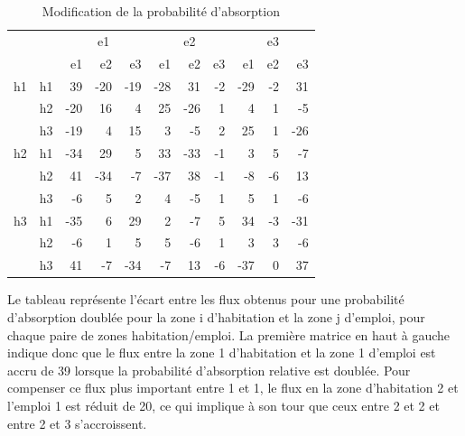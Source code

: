 \documentclass[
  10pt,
  a4paper,
  numbers=noendperiod,
  DIV=9]{scrreprt}
\begin{document}
\hypertarget{tbl-fluxpond}{}
\setlength{\LTpost}{0mm}
\begin{longtable}{l|lrrrrrrrrr}
\caption{\label{tbl-fluxpond}Modification de la probabilité d'absorption }\tabularnewline

\toprule
\multicolumn{1}{l}{} &  & \multicolumn{3}{c}{e1} & \multicolumn{3}{c}{e2} & \multicolumn{3}{c}{e3} \\ 
\cmidrule(lr){3-5} \cmidrule(lr){6-8} \cmidrule(lr){9-11}
\multicolumn{1}{l}{} &  & e1 & e2 & e3 & e1 & e2 & e3 & e1 & e2 & e3 \\ 
\midrule
h1 & h1 & 39 & -20 & -19 & -28 & 31 & -2 & -29 & -2 & 31 \\ 
 & h2 & -20 & 16 & 4 & 25 & -26 & 1 & 4 & 1 & -5 \\ 
 & h3 & -19 & 4 & 15 & 3 & -5 & 2 & 25 & 1 & -26 \\ 
\midrule
h2 & h1 & -34 & 29 & 5 & 33 & -33 & -1 & 3 & 5 & -7 \\ 
 & h2 & 41 & -34 & -7 & -37 & 38 & -1 & -8 & -6 & 13 \\ 
 & h3 & -6 & 5 & 2 & 4 & -5 & 1 & 5 & 1 & -6 \\ 
\midrule
h3 & h1 & -35 & 6 & 29 & 2 & -7 & 5 & 34 & -3 & -31 \\ 
 & h2 & -6 & 1 & 5 & 5 & -6 & 1 & 3 & 3 & -6 \\ 
 & h3 & 41 & -7 & -34 & -7 & 13 & -6 & -37 & 0 & 37 \\ 
\bottomrule
\end{longtable}
\begin{minipage}{\linewidth}
Le tableau représente l'écart entre les flux obtenus pour une probabilité d'absorption doublée
    pour la zone i d'habitation et la zone j d'emploi, pour chaque paire de zones habitation/emploi. 
    La première matrice en haut à gauche indique donc que le flux entre la zone 1 d'habitation et 
    la zone 1 d'emploi est accru de 39 lorsque la probabilité d'absorption relative est doublée. 
    Pour compenser ce flux plus important entre 1 et 1, le flux en la zone d'habitation 2 et l'emploi 1 est réduit de 20, 
    ce qui implique à son tour que ceux entre 2 et 2 et entre 2 et 3 s'accroissent.\\
\end{minipage}
\end{document}
